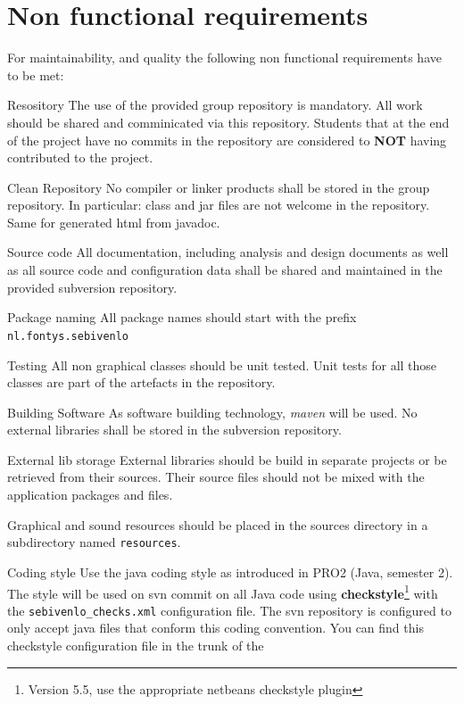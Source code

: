 \section{Non functional requirements}
For maintainability, and quality the following non functional
requirements have to be met:
\begin{Description}
    \item[Resository] The use of the provided group repository is mandatory.
    All work should be shared and comminicated via this repository. 
    Students that at the end of the project have no commits in the repository are considered to \textbf{NOT} 
    having contributed to the project.
\item[Clean Repository] No compiler or linker products shall be stored in the 
group repository. In particular: class and jar files are not welcome in the repository. 
Same for generated html from
javadoc.
\item[Source code] All documentation, including analysis and design
  documents as well as all source code and configuration data shall be
  shared and maintained in the provided subversion repository.
\item[Package naming] All package names should start with the prefix
  \texttt{nl.fontys.sebivenlo}
\item[Testing] All non graphical classes should be unit tested. Unit tests for
  all those classes are part of the artefacts in the repository.
\item[Building Software] As software building technology,
  \textit{maven} will be used. No external libraries shall be stored
  in the subversion repository.
\item[External lib storage] External libraries should be build in
  separate projects or be retrieved from their sources. Their source
  files should not be mixed with the application packages and
  files.
\item[Graphical and sound resources] should be placed in the sources directory
  in a subdirectory named \texttt{resources}.
\item[Coding style] Use the java coding style as introduced in
  PRO2 (Java, semester 2). The style will be used on svn commit on all
  Java code using \textbf{checkstyle}\footnote{Version 5.5, use the appropriate
    netbeans checkstyle plugin} with the \texttt{sebivenlo\_checks.xml}
  configuration file. The svn repository is configured to only accept
  java files that conform this coding convention.
  You can find this checkstyle configuration file in the trunk  of the

\end{Description}
